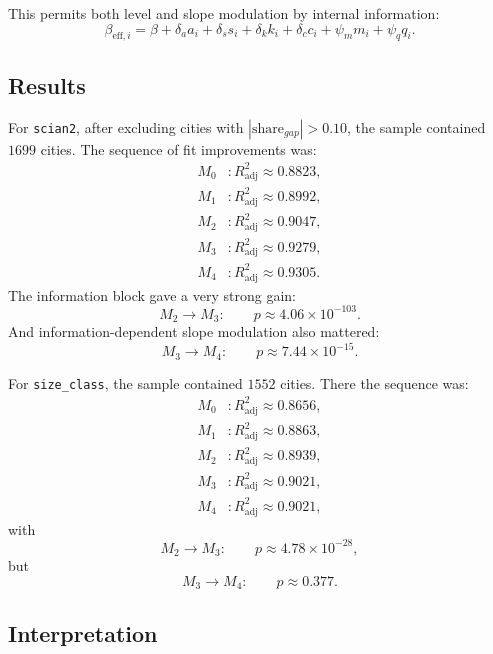 \documentclass[11pt]{article}
\newcommand{\adjR}{R^2_{\mathrm{adj}}}
\begin{document}
This permits both level and slope modulation by internal information:
\begin{equation}
\beta_{\mathrm{eff},i}
=
\beta+\delta_a a_i+\delta_s s_i+\delta_k k_i+\delta_c c_i+\psi_m m_i+\psi_q q_i.
\end{equation}

\subsection{Results}

For \texttt{scian2}, after excluding cities with \(|\text{share}_{gap}|>0.10\), the sample contained \(1699\) cities. The sequence of fit improvements was:
\begin{align}
M_0 &: \adjR \approx 0.8823,\\
M_1 &: \adjR \approx 0.8992,\\
M_2 &: \adjR \approx 0.9047,\\
M_3 &: \adjR \approx 0.9279,\\
M_4 &: \adjR \approx 0.9305.
\end{align}
The information block gave a very strong gain:
\begin{equation}
M_2 \rightarrow M_3:
\qquad
p \approx 4.06\times 10^{-103}.
\end{equation}
And information-dependent slope modulation also mattered:
\begin{equation}
M_3 \rightarrow M_4:
\qquad
p \approx 7.44\times 10^{-15}.
\end{equation}

For \texttt{size\_class}, the sample contained \(1552\) cities. There the sequence was:
\begin{align}
M_0 &: \adjR \approx 0.8656,\\
M_1 &: \adjR \approx 0.8863,\\
M_2 &: \adjR \approx 0.8939,\\
M_3 &: \adjR \approx 0.9021,\\
M_4 &: \adjR \approx 0.9021,
\end{align}
with
\begin{equation}
M_2 \rightarrow M_3:
\qquad
p \approx 4.78\times 10^{-28},
\end{equation}
but
\begin{equation}
M_3 \rightarrow M_4:
\qquad
p \approx 0.377.
\end{equation}

\subsection{Interpretation}
\end{document}
